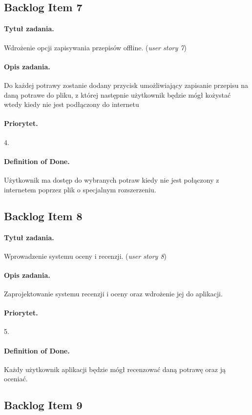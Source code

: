 \documentclass[a4paper]{article}
\begin{document}
	\subsection{Backlog Item 7}
	\paragraph{Tytuł zadania.} Wdrożenie opcji zapisywania przepisów offline. (\textit{user story 7})
	\paragraph{Opis zadania.} Do każdej potrawy zostanie dodany przycisk umożliwiający zapisanie przepisu na daną potrawe do pliku, z której następnie użytkownik będzie mógł kożystać wtedy kiedy nie jest podłączony do internetu
	\paragraph{Priorytet.} 4.
	\paragraph{Definition of Done.} Użytkownik ma dostęp do wybranych potraw kiedy nie jest połączony z internetem poprzez plik o specjalnym rozszerzeniu.
	
	\subsection{Backlog Item 8}
	\paragraph{Tytuł zadania.} Wprowadzenie systemu oceny i recenzji. (\textit{user story 8})
	\paragraph{Opis zadania.} Zaprojektowanie systemu recenzji i oceny oraz wdrożenie jej do aplikacji.
	\paragraph{Priorytet.} 5.
	\paragraph{Definition of Done.} Każdy użytkownik aplikacji będzie mógł recenzować daną potrawę oraz ją oceniać.
	
	\subsection{Backlog Item 9}
\end{document}
